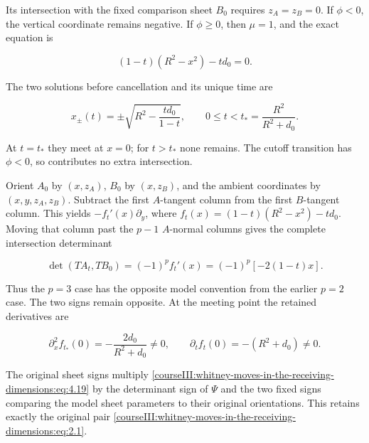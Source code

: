 Its intersection with the fixed comparison sheet \(B_0\) requires \(z_A=z_B=0\). If \(\phi<0\), the vertical coordinate remains negative. If \(\phi\geq0\), then \(\mu=1\), and the exact equation is

\begin{equation}
(1-t)(R^2-x^2)-td_0=0.
 \label{courseIII:whitney-moves-in-the-receiving-dimensions:eq:4.17}
\end{equation}

The two solutions before cancellation and its unique time are

\begin{equation}
x_\pm(t)=\pm\sqrt{R^2-\frac{td_0}{1-t}},\qquad
 0\leq t<t_*=\frac{R^2}{R^2+d_0}.
 \label{courseIII:whitney-moves-in-the-receiving-dimensions:eq:4.18}
\end{equation}

At \(t=t_*\) they meet at \(x=0\); for \(t>t_*\) none remains. The cutoff transition has \(\phi<0\), so contributes no extra intersection.

Orient \(A_0\) by \((x,z_A)\), \(B_0\) by \((x,z_B)\), and the ambient coordinates by \((x,y,z_A,z_B)\). Subtract the first \(A\)-tangent column from the first \(B\)-tangent column. This yields \(-f_t'(x)\partial_y\), where \(f_t(x)=(1-t)(R^2-x^2)-td_0\). Moving that column past the \(p-1\) \(A\)-normal columns gives the complete intersection determinant

\begin{equation}
\det(TA_t,TB_0)=(-1)^p f_t'(x)
             =(-1)^p[-2(1-t)x].
 \label{courseIII:whitney-moves-in-the-receiving-dimensions:eq:4.19}
\end{equation}

Thus the \(p=3\) case has the opposite model convention from the earlier \(p=2\) case. The two signs remain opposite. At the meeting point the retained derivatives are

\begin{equation}
\partial_x^2 f_{t_*}(0)=-\frac{2d_0}{R^2+d_0}\ne0,\qquad
 \partial_t f_t(0)=-(R^2+d_0)\ne0.
 \label{courseIII:whitney-moves-in-the-receiving-dimensions:eq:4.20}
\end{equation}

The original sheet signs multiply \eqref{courseIII:whitney-moves-in-the-receiving-dimensions:eq:4.19} by the determinant sign of \(\Psi\) and the two fixed signs comparing the model sheet parameters to their original orientations. This retains exactly the original pair \eqref{courseIII:whitney-moves-in-the-receiving-dimensions:eq:2.1}.


